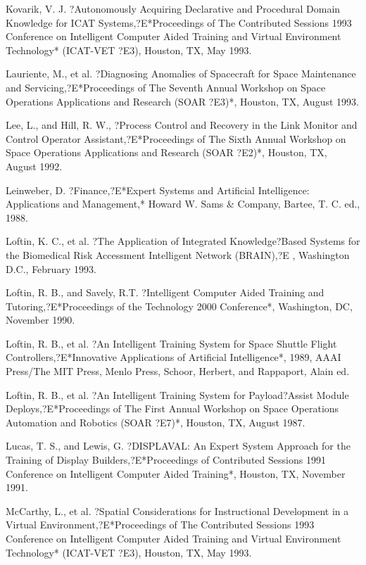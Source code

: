 \documentclass[letterpaper,10pt,english]{sphinxmanual}
\begin{document}
Kovarik, V. J. ?Autonomously Acquiring Declarative and Procedural Domain
Knowledge for ICAT Systems,?E*Proceedings of The Contributed Sessions
1993 Conference on Intelligent Computer Aided Training and Virtual
Environment Technology* (ICAT-VET ?E3), Houston, TX, May 1993.

Lauriente, M., et al. ?Diagnosing Anomalies of Spacecraft for Space
Maintenance and Servicing,?E*Proceedings of The Seventh Annual Workshop
on Space Operations Applications and Research (SOAR ?E3)*, Houston, TX,
August 1993.

Lee, L., and Hill, R. W., ?Process Control and Recovery in the Link
Monitor and Control Operator Assistant,?E*Proceedings of The Sixth
Annual Workshop on Space Operations Applications and Research (SOAR
?E2)*, Houston, TX, August 1992.

Leinweber, D. ?Finance,?E*Expert Systems and Artificial Intelligence:
Applications and Management,* Howard W. Sams \& Company, Bartee, T. C.
ed., 1988.

Loftin, K. C., et al. ?The Application of Integrated Knowledge?Based
Systems for the Biomedical Risk Accessment Intelligent Network (BRAIN),?E
, Washington D.C., February 1993.

Loftin, R. B., and Savely, R.T. ?Intelligent Computer Aided Training and
Tutoring,?E*Proceedings of the Technology 2000 Conference*, Washington,
DC, November 1990.

Loftin, R. B., et al. ?An Intelligent Training System for Space Shuttle
Flight Controllers,?E*Innovative Applications of Artificial
Intelligence*, 1989, AAAI Press/The MIT Press, Menlo Press, Schoor,
Herbert, and Rappaport, Alain ed.

Loftin, R. B., et al. ?An Intelligent Training System for Payload?Assist
Module Deploys,?E*Proceedings of The First Annual Workshop on Space
Operations Automation and Robotics (SOAR ?E7)*, Houston, TX, August
1987.

Lucas, T. S., and Lewis, G. ?DISPLAVAL: An Expert System Approach for
the Training of Display Builders,?E*Proceedings of Contributed Sessions
1991 Conference on Intelligent Computer Aided Training*, Houston, TX,
November 1991.

McCarthy, L., et al. ?Spatial Considerations for Instructional
Development in a Virtual Environment,?E*Proceedings of The Contributed
Sessions 1993 Conference on Intelligent Computer Aided Training and
Virtual Environment Technology* (ICAT-VET ?E3), Houston, TX, May 1993.
\end{document}
